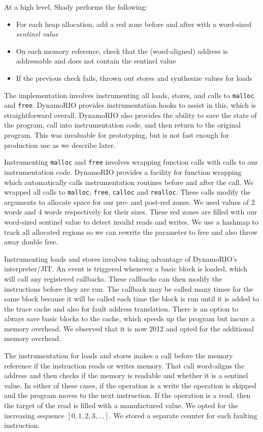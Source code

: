 \documentclass{article}
\newcommand{\code}[1]{\texttt{#1}}
\begin{document}
At a high level, Shady performs the following:
\begin{itemize}
\item For each heap allocation, add a red zone before and after with a word-sized \textit{sentinel value}
\item On each memory reference, check that the (word-aligned) address is addressable and does not contain the sentinel value
\item If the previous check fails, thrown out stores and synthesize values for loads
\end{itemize}

The implementation involves instrumenting all loads, stores, and calls to \code{malloc} and \code{free}.  DynamoRIO provides instrumentation hooks to assist in this, which is straightforward overall.  DynamoRIO also provides the ability to save the state of the program, call into instrumentation code, and then return to the original program.  This was invaluable for prototyping, but is not fast enough for production use as we describe later.

Instrumenting \code{malloc} and \code{free} involves wrapping function calls with calls to our instrumentation code.  DynamoRIO provides a facility for function wrapping which automatically calls instrumentation routines before and after the call.  We wrapped all calls to \code{malloc}, \code{free}, \code{calloc} and \code{realloc}.  These calls modify the arguments to allocate space for our pre- and post-red zones.  We used values of 2 words and 4 words respectively for their sizes.  These red zones are filled with our word-sized sentinel value to detect invalid reads and writes. We use a hashmap to track all allocated regions so we can rewrite the parameter to free and also throw away double free.

Instrumenting loads and stores involves taking advantage of DynamoRIO's interpreter/JIT.  An event is triggered whenever a basic block is loaded, which will call any registered callbacks.  These callbacks can then modify the instructions before they are run.  The callback may be called many times for the same block because it will be called each time the block is run until it is added to the trace cache and also for fault address translation.  There is an option to always save basic blocks to the cache, which speeds up the program but incurs a memory overhead.  We observed that it is now 2012 and opted for the additional memory overhead.

The instrumentation for loads and stores makes a call before the memory reference if the instruction reads or writes memory.  That call word-aligns the address and then checks if the memory is readable and whether it is a sentinel value.  In either of these cases, if the operation is a write the operation is skipped and the program moves to the next instruction.  If the operation is a read, then the target of the read is filled with a manufactured value.  We opted for the increasing sequence $[0,1,2,3,\dots]$.  We stored a separate counter for each faulting instruction.
\end{document}
